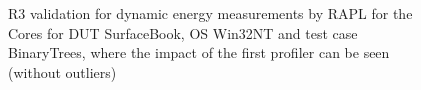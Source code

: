 \begin{figure}
                            \caption{R3 validation for dynamic energy measurements by RAPL for the Cores for DUT SurfaceBook, OS Win32NT and test case BinaryTrees, where the impact of the first profiler can be seen (without outliers)} \label{fig:SurfaceBook_RAPL_Cores_R3_dynamic_energy_without_outliers_Win32NT_avg_watts}
                            \end{figure}
                            